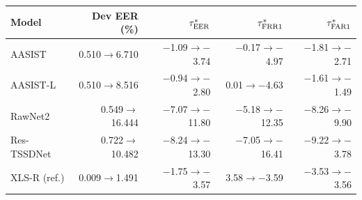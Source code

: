 \begin{tabular}{@{}lrrrr@{}}
\toprule
Model & Dev EER (\%) & $\tau^{*}_{\mathrm{EER}}$ & $\tau^{*}_{\mathrm{FRR}1}$ & $\tau^{*}_{\mathrm{FAR}1}$ \\
\midrule
AASIST & 0.510$\to$6.710 & $-$1.09$\to$$-$3.74 & $-$0.17$\to$$-$4.97 & $-$1.81$\to$$-$2.71 \\
AASIST-L & 0.510$\to$8.516 & $-$0.94$\to$$-$2.80 & 0.01$\to$$-$4.63 & $-$1.61$\to$$-$1.49 \\
RawNet2 & 0.549$\to$16.444 & $-$7.07$\to$$-$11.80 & $-$5.18$\to$$-$12.35 & $-$8.26$\to$$-$9.90 \\
Res-TSSDNet & 0.722$\to$10.482 & $-$8.24$\to$$-$13.30 & $-$7.05$\to$$-$16.41 & $-$9.22$\to$$-$3.78 \\
XLS-R (ref.) & 0.009$\to$1.491 & $-$1.75$\to$$-$3.57 & 3.58$\to$$-$3.59 & $-$3.53$\to$$-$3.56 \\
\bottomrule
\end{tabular}
